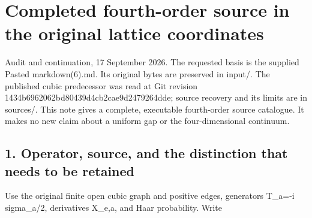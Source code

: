 \documentclass[11pt,a4paper]{article}
\let\originalsection\section
\renewcommand{\section}{\clearpage\originalsection}
\renewcommand{\[}{\begingroup\small\originaldisplaystart}
\renewcommand{\]}{\originaldisplayend\endgroup}
\begin{document}
\section{Completed fourth-order source in the original lattice
coordinates}\label{completed-fourth-order-source-in-the-original-lattice-coordinates}

Audit and continuation, 17 September 2026. The requested basis is the
supplied
{\ttfamily P\allowbreak{}a\allowbreak{}s\allowbreak{}t\allowbreak{}e\allowbreak{}d\allowbreak{} \allowbreak{}m\allowbreak{}a\allowbreak{}r\allowbreak{}k\allowbreak{}d\allowbreak{}o\allowbreak{}w\allowbreak{}n\allowbreak{}(\allowbreak{}6\allowbreak{})\allowbreak{}.\allowbreak{}m\allowbreak{}d\allowbreak{}}.
Its original bytes are preserved in
{\ttfamily i\allowbreak{}n\allowbreak{}p\allowbreak{}u\allowbreak{}t\allowbreak{}/\allowbreak{}}.
The published cubic predecessor was read at Git revision
{\allowbreak{}1\allowbreak{}4\allowbreak{}3\allowbreak{}4\allowbreak{}b\allowbreak{}6\allowbreak{}9\allowbreak{}6\allowbreak{}2\allowbreak{}0\allowbreak{}6\allowbreak{}2\allowbreak{}b\allowbreak{}d\allowbreak{}8\allowbreak{}0\allowbreak{}4\allowbreak{}3\allowbreak{}9\allowbreak{}d\allowbreak{}4\allowbreak{}c\allowbreak{}b\allowbreak{}2\allowbreak{}c\allowbreak{}a\allowbreak{}e\allowbreak{}9\allowbreak{}d\allowbreak{}2\allowbreak{}4\allowbreak{}7\allowbreak{}9\allowbreak{}2\allowbreak{}6\allowbreak{}4\allowbreak{}d\allowbreak{}d\allowbreak{}e\allowbreak{}};
source recovery and its limits are in
{\ttfamily s\allowbreak{}o\allowbreak{}u\allowbreak{}r\allowbreak{}c\allowbreak{}e\allowbreak{}s\allowbreak{}/\allowbreak{}}.
This note gives a complete, executable fourth-order source catalogue. It
makes no new claim about a uniform gap or the four-dimensional
continuum.

\subsection{1. Operator, source, and the distinction that needs to be
retained}\label{operator-source-and-the-distinction-that-needs-to-be-retained}

Use the original finite open cubic graph and positive edges, generators
{\ttfamily T\allowbreak{}\_\allowbreak{}a\allowbreak{}=\allowbreak{}-\allowbreak{}i\allowbreak{} \allowbreak{}s\allowbreak{}i\allowbreak{}g\allowbreak{}m\allowbreak{}a\allowbreak{}\_\allowbreak{}a\allowbreak{}/\allowbreak{}2\allowbreak{}},
derivatives
{\ttfamily X\allowbreak{}\_\allowbreak{}e\allowbreak{},\allowbreak{}a\allowbreak{}},
and Haar probability. Write
\end{document}
